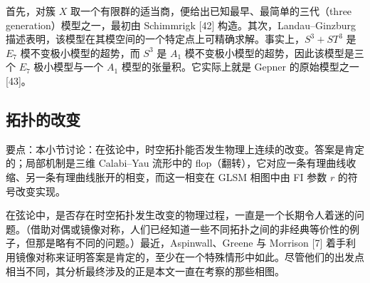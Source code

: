 
\label{op:66}

首先，对簇 $X$ 取一个有限群的适当商，便给出已知最早、最简单的三代（three generation）模型之一，最初由 Schimmrigk [42] 构造。其次，Landau--Ginzburg 描述表明，该模型在其模空间的一个特定点上可精确求解。事实上，$S^{3}+ST^{3}$ 是 $E_{7}$ 模不变极小模型的超势，而 $S^{3}$ 是 $A_{1}$ 模不变极小模型的超势，因此该模型是三个 $E_{7}$ 极小模型与一个 $A_{1}$ 模型的张量积。它实际上就是 Gepner 的原始模型之一 [43]。

\subsection{拓扑的改变}

要点：本小节讨论：在弦论中，时空拓扑能否发生物理上连续的改变。答案是肯定的；局部机制是三维 Calabi--Yau 流形中的 flop（翻转），它对应一条有理曲线收缩、另一条有理曲线胀开的相变，而这一相变在 GLSM 相图中由 FI 参数 $r$ 的符号改变实现。

在弦论中，是否存在时空拓扑发生改变的物理过程，一直是一个长期令人着迷的问题。（借助对偶或镜像对称，人们已经知道一些不同拓扑之间的非经典等价性的例子，但那是略有不同的问题。）最近，Aspinwall、Greene 与 Morrison [7] 着手利用镜像对称来证明答案是肯定的，至少在一个特殊情形中如此。尽管他们的出发点相当不同，其分析最终涉及的正是本文一直在考察的那些相图。

